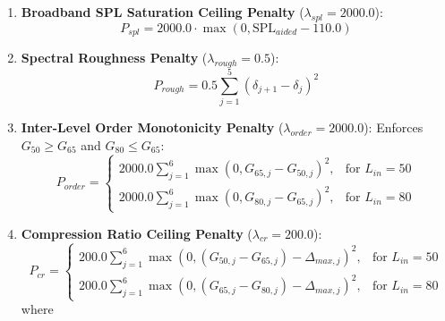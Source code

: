 \documentclass[
  12pt,
]{article}
\providecommand{\tightlist}{%
  \setlength{\itemsep}{0pt}\setlength{\parskip}{0pt}}
\begin{document}
\begin{enumerate}
  \emph{Profile Adjustments:}

  \begin{itemize}
  \tightlist
  \item
    Reverse-slope restriction (\(L_{in} \ge 75\) dB SPL and low-to-high
    threshold difference \(> 10\) dB):
    \(\text{Cap} = \text{Cap}_{base} - 0.10 \cdot (\overline{\text{HTL}}_{\le 500} - \overline{\text{HTL}}_{\ge 4000})\).
  \item
    Conductive air-bone gap adjustment:
    \(\text{Cap} \leftarrow \text{Cap} - 0.25 \cdot \text{PTA}_{ABG}\)
    (if \(L_{in} \ge 75\) dB SPL) or \(+0.10 \cdot \text{PTA}_{ABG}\)
    (if \(L_{in} < 75\) dB SPL).
  \end{itemize}
\item
  \textbf{Broadband SPL Saturation Ceiling Penalty}
  (\(\lambda_{spl} = 2000.0\)): \begin{equation}
  P_{spl} = 2000.0 \cdot \max\left(0, \text{SPL}_{aided} - 110.0\right)
  \end{equation}
\item
  \textbf{Spectral Roughness Penalty} (\(\lambda_{rough} = 0.5\)):
  \begin{equation}
  P_{rough} = 0.5 \sum_{j=1}^5 (\delta_{j+1} - \delta_j)^2
  \end{equation}
\item
  \textbf{Inter-Level Order Monotonicity Penalty}
  (\(\lambda_{order} = 2000.0\)): Enforces \(G_{50} \ge G_{65}\) and
  \(G_{80} \le G_{65}\): \begin{equation}
  P_{order} = \begin{cases} 
  2000.0 \sum_{j=1}^6 \max(0, G_{65, j} - G_{50, j})^2, & \text{for } L_{in} = 50 \\ 
  2000.0 \sum_{j=1}^6 \max(0, G_{80, j} - G_{65, j})^2, & \text{for } L_{in} = 80 
  \end{cases}
  \end{equation}
\item
  \textbf{Compression Ratio Ceiling Penalty} (\(\lambda_{cr} = 200.0\)):
  \begin{equation}
  P_{cr} = \begin{cases} 
  200.0 \sum_{j=1}^6 \max\left(0, (G_{50, j} - G_{65, j}) - \Delta_{max, j}\right)^2, & \text{for } L_{in} = 50 \\ 
  200.0 \sum_{j=1}^6 \max\left(0, (G_{65, j} - G_{80, j}) - \Delta_{max, j}\right)^2, & \text{for } L_{in} = 80 
  \end{cases}
  \end{equation} where

\end{enumerate}
\end{document}
